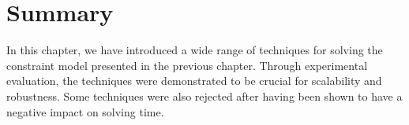 \section{Summary}

In this chapter, we have introduced a wide range of techniques for solving the
\gls{constraint model} presented in the previous chapter.
%
Through experimental evaluation, the techniques were demonstrated to be
crucial for scalability and robustness.
%
Some techniques were also rejected after having been shown to have a negative
impact on solving time.
